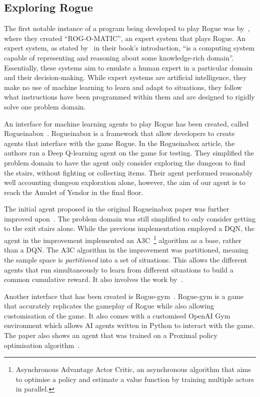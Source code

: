 \documentclass[12pt,a4paper]{article}
\begin{document}
    \subsection{Exploring Rogue}\label{subsec:exploring-rogue}
    The first notable instance of a program being developed to play Rogue was by~\citet{mauldin83}, where they created ``ROG-O-MATIC'', an expert system that plays Rogue.
    An expert system, as stated by~\citet{jackson86} in their book's introduction, ``is a computing system capable of representing and reasoning about some knowledge-rich domain''.
    Essentially, these systems aim to emulate a human expert in a particular domain and their decision-making.
    While expert systems are artificial intelligence, they make no use of machine learning to learn and adapt to situations, they follow what instructions have been programmed within them and are designed to rigidly solve one problem domain.

    An interface for machine learning agents to play Rogue has been created, called Rogueinabox~\citep{asperti17}.
    Rogueinabox is a framework that allow developers to create agents that interface with the game Rogue.
    In the Rogueinabox article, the authors ran a Deep Q-learning agent on the game for testing.
    They simplified the problem domain to have the agent only consider exploring the dungeon to find the stairs, without fighting or collecting items.
    Their agent performed reasonably well accounting dungeon exploration alone, however, the aim of our agent is to reach the Amulet of Yendor in the final floor.

    The initial agent proposed in the original Rogueinabox paper was further improved upon~\citep{asperti18}.
    The problem domain was still simplified to only consider getting to the exit stairs alone.
    While the previous implementation employed a DQN, the agent in the improvement implemented an A3C~\citep{mnih15}\footnote{Asynchronous Advantage Actor Critic, an asynchronous algorithm that aims to optimise a policy and estimate a value function by training multiple actors in parallel.} algorithm as a base, rather than a DQN. The A3C algorithm in the improvement was partitioned, meaning the sample space is \emph{partitioned} into a set of situations.
    This allows the different agents that run simultaneously to learn from different situations to build a common cumulative reward.
    It also involves the work by~\citet{jaderberg16}.

    Another interface that has been created is Rogue-gym~\citep{kanagawa19}.
    Rogue-gym is a game that accurately replicates the gameplay of Rogue while also allowing customisation of the game.
    It also comes with a customised OpenAI Gym environment which allows AI agents written in Python to interact with the game.
    The paper also shows an agent that was trained on a Proximal policy optimisation algorithm~\citep{schulman17}.
\end{document}
